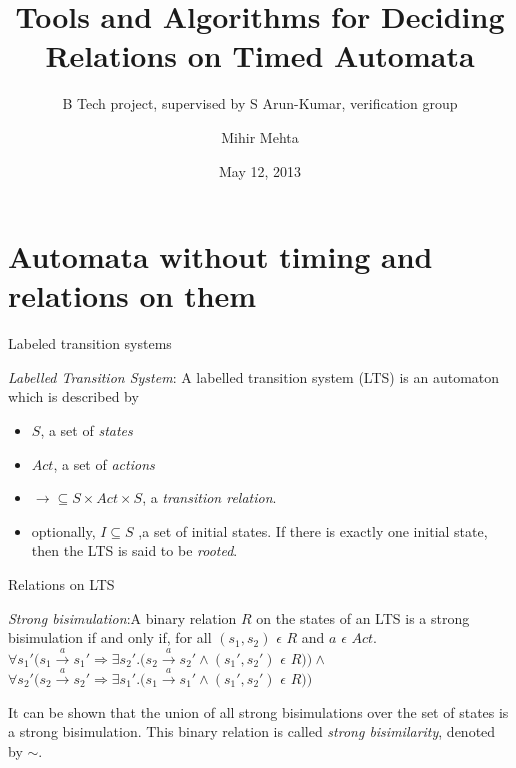 \documentclass{beamer}
\title{Tools and Algorithms for Deciding Relations on Timed Automata}
\subtitle{B Tech project, supervised by S Arun-Kumar, verification group}
\author{Mihir Mehta}
\institute[IITD]{
  Department of Computer Science and Engineering\\
  Indian Institute of Technology, Delhi\\[1ex]
  \texttt{cs1090197}
}
\date[May 2013]{May 12, 2013}
\begin{document}
\begin{frame}[plain]
  \titlepage
\end{frame}


\section{Automata without timing and relations on them}

\begin{frame}{Labeled transition systems}
  \begin{definition}
    \emph{Labelled Transition System}: A labelled transition system (LTS)
    \cite{Keller:1976:FVP:360248.360251} is an automaton which is
    described by
    \begin{itemize}
    \item $S$, a set of \emph{states} 
    \item $Act$, a set of \emph{actions}
    \item $\rightarrow \subseteq S \times Act \times S$, a \emph{transition
      relation}.
    \item optionally, $I \subseteq S$ ,a set of initial states. If there
      is exactly one initial state, then the LTS is said to be \emph{rooted}.
    \end{itemize}
  \end{definition}
\end{frame}

\begin{frame}[allowframebreaks]{Relations on LTS}

\begin{definition}
\emph{Strong bisimulation}:A binary relation $R$ on the states of an
LTS is a strong bisimulation if and only if, for all
 $(s_1, s_2)$ $\epsilon$ $R$ and $a$ $\epsilon$ $Act .$\\
$\forall s_1' (s_1 \xrightarrow{a} s_1' \Rightarrow \exists s_2'
. (s_2 \xrightarrow{a} s_2' \wedge (s_1', s_2')$ $\epsilon$ $R ) )
\wedge $ \\
$\forall s_2' (s_2 \xrightarrow{a} s_2' \Rightarrow \exists s_1'
. (s_1 \xrightarrow{a} s_1' \wedge (s_1', s_2')$ $\epsilon$ $R ) )$
\end{definition}

\begin{definition}
It can be shown that the union of
all strong bisimulations over the set of states is a strong
bisimulation. This binary relation is called \emph{strong
  bisimilarity}, denoted by $\sim$.
\end{definition}

\end{frame}
\end{document}
